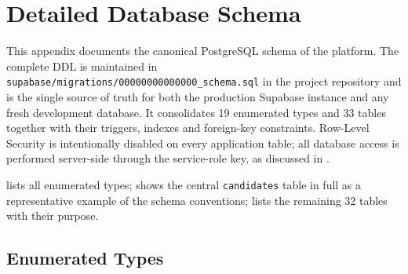 \chapter{Detailed Database Schema}
\label{app:db-schema}

This appendix documents the canonical PostgreSQL schema of the platform.
The complete DDL is maintained in
\texttt{supabase/migrations/00000000000000\_schema.sql} in the project
repository and is the single source of truth for both the production Supabase
instance and any fresh development database. It consolidates 19 enumerated
types and 33 tables together with their triggers, indexes and foreign-key
constraints. Row-Level Security is intentionally disabled on every application
table; all database access is performed server-side through the service-role
key, as discussed in .

 lists all enumerated types;  shows the central \texttt{candidates} table in full as a representative example of the schema conventions;  lists the remaining 32 tables with their purpose.

\section{Enumerated Types}
\label{app:db-enums}

